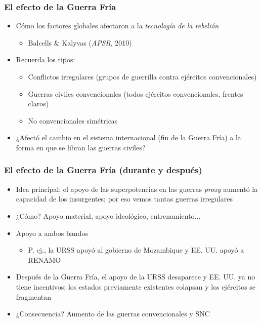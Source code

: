 \begin{frame}
\frametitle{El efecto de la Guerra Fría}
\centering

\begin{itemize}
  \item<2-> Cómo los factores globales afectaron a la \textit{tecnología de la rebelión}
  \begin{itemize}
    \item[] {\footnotesize Balcells \& Kalyvas (\textit{APSR}, 2010)}
  \end{itemize}
  \item<3-> Recuerda los tipos:
  \begin{itemize}
    \item Conflictos irregulares (grupos de guerrilla contra ejércitos convencionales)
    \item Guerras civiles convencionales (todos ejércitos convencionales, frentes claros)
    \item No convencionales simétricas
  \end{itemize}
  \item<3-> ¿Afectó el cambio en el sistema internacional (fin de la Guerra Fría) a la forma en que se libran las guerras civiles?
\end{itemize}

\end{frame}
\note{}

\begin{frame}
\frametitle{El efecto de la Guerra Fría (durante y después)}
\centering

\begin{itemize}
  \item Idea principal: el apoyo de las superpotencias en las guerras \textit{proxy} aumentó la capacidad de los insurgentes; por eso vemos tantas guerras irregulares
  \item ¿Cómo? Apoyo material, apoyo ideológico, entrenamiento...
  \item Apoyo a ambos bandos
  \begin{itemize}
    \item P. ej., la URSS apoyó al gobierno de Mozambique y EE. UU. apoyó a RENAMO
  \end{itemize}
  \item<2-> Después de la Guerra Fría, el apoyo de la URSS desaparece y EE. UU. ya no tiene incentivos; los estados previamente existentes colapsan y los ejércitos se fragmentan
  \item<2-> ¿Consecuencia? Aumento de las guerras convencionales y SNC
\end{itemize}

\end{frame}
\note{}


